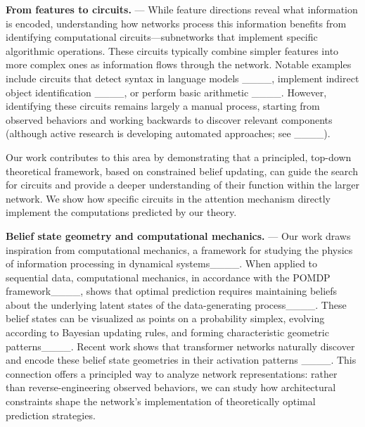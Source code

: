\textbf{From features to circuits.}
---
While feature directions reveal what information is encoded, understanding how networks process this information benefits from identifying computational circuits—subnetworks that implement specific algorithmic operations.
These circuits typically combine simpler features into more complex ones as information flows through the network.
Notable examples include circuits that detect syntax in language models ____, implement indirect object identification ____, or perform basic arithmetic ____.
However, identifying these circuits remains largely a manual process, starting from observed behaviors and working backwards to discover relevant components
(although active research is developing automated approaches; see ____).

Our work contributes to this area by demonstrating that a principled, top-down theoretical framework, based on constrained belief updating, can guide the search for circuits and provide a deeper understanding of their function within the larger network. We show how specific circuits in the attention mechanism directly implement the computations predicted by our theory.

\textbf{Belief state geometry and computational mechanics.}
---
Our work draws inspiration from computational mechanics, a framework for studying the physics of information processing in dynamical systems____. When applied to sequential data, computational mechanics, in accordance with the POMDP framework____, 
shows that optimal prediction requires maintaining beliefs about the underlying latent states of the data-generating process____. 
These belief states can be visualized as points on a probability simplex, evolving according to Bayesian updating rules, and forming characteristic geometric patterns____.
Recent work shows that transformer networks naturally discover and encode these belief state geometries in their activation patterns ____.
This connection offers a principled way to analyze network representations: rather than reverse-engineering observed behaviors, we can study how architectural constraints shape the network's implementation of theoretically optimal prediction strategies.

